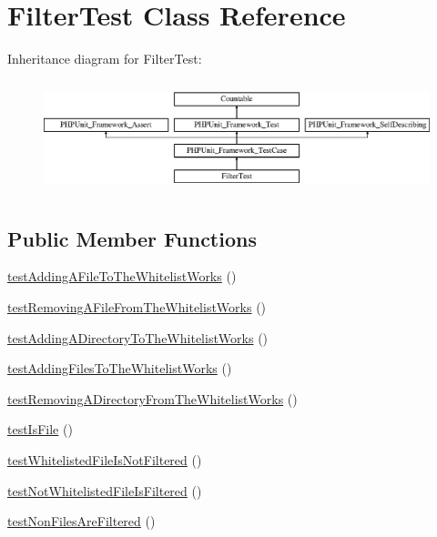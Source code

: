 \hypertarget{class_sebastian_bergmann_1_1_code_coverage_1_1_filter_test}{}\section{Filter\+Test Class Reference}
\label{class_sebastian_bergmann_1_1_code_coverage_1_1_filter_test}
Inheritance diagram for Filter\+Test\+:\begin{figure}[H]
\begin{center}
\leavevmode
\includegraphics[height=3.303835cm]{class_sebastian_bergmann_1_1_code_coverage_1_1_filter_test}
\end{center}
\end{figure}
\subsection*{Public Member Functions}
\begin{DoxyCompactItemize}
\item 
\mbox{\hyperlink{class_sebastian_bergmann_1_1_code_coverage_1_1_filter_test_a949a7c86d9d87b3412cedf67ac6f54d4}{test\+Adding\+A\+File\+To\+The\+Whitelist\+Works}} ()
\item 
\mbox{\hyperlink{class_sebastian_bergmann_1_1_code_coverage_1_1_filter_test_a2f4c0d5028c0f70ce6f5b103016c7f55}{test\+Removing\+A\+File\+From\+The\+Whitelist\+Works}} ()
\item 
\mbox{\hyperlink{class_sebastian_bergmann_1_1_code_coverage_1_1_filter_test_ab1a4dcccd463fac4f3c865b7bb29a530}{test\+Adding\+A\+Directory\+To\+The\+Whitelist\+Works}} ()
\item 
\mbox{\hyperlink{class_sebastian_bergmann_1_1_code_coverage_1_1_filter_test_ab061ac13df762ba16231df8175d8d512}{test\+Adding\+Files\+To\+The\+Whitelist\+Works}} ()
\item 
\mbox{\hyperlink{class_sebastian_bergmann_1_1_code_coverage_1_1_filter_test_a45d65204a26a1e4e73f3fa04f4f46331}{test\+Removing\+A\+Directory\+From\+The\+Whitelist\+Works}} ()
\item 
\mbox{\hyperlink{class_sebastian_bergmann_1_1_code_coverage_1_1_filter_test_a384f8adbdbabc204730f4375e9fe7a75}{test\+Is\+File}} ()
\item 
\mbox{\hyperlink{class_sebastian_bergmann_1_1_code_coverage_1_1_filter_test_ab24c6f9f8ee1d57d46a38b69cee91b2b}{test\+Whitelisted\+File\+Is\+Not\+Filtered}} ()
\item 
\mbox{\hyperlink{class_sebastian_bergmann_1_1_code_coverage_1_1_filter_test_a6bcf683febf12d8e6809f8d292cf66a4}{test\+Not\+Whitelisted\+File\+Is\+Filtered}} ()
\item 
\mbox{\hyperlink{class_sebastian_bergmann_1_1_code_coverage_1_1_filter_test_a7a8524ad734af22d229a7b1cd403d1c4}{test\+Non\+Files\+Are\+Filtered}} ()
\end{DoxyCompactItemize}
